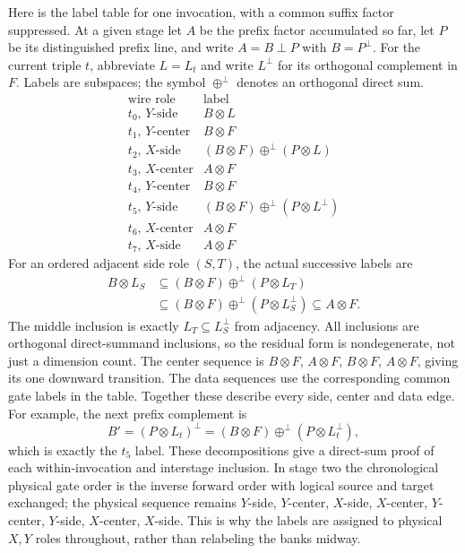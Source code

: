 Here is the label table for one invocation, with a common suffix factor suppressed. At a given stage let $A$ be the prefix factor accumulated so far, let $P$ be its distinguished prefix line, and write $A=B\perp P$ with $B=P^\perp$. For the current triple $t$, abbreviate $L=L_t$ and write $L^\perp$ for its orthogonal complement in $F$. Labels are subspaces; the symbol $\oplus^\perp$ denotes an orthogonal direct sum.
\[
\begin{array}{c|c}
\text{wire role}&\text{label}\\\hline
 t_0\text{, }Y\text{-side}&B\otimes L\\
 t_1\text{, }Y\text{-center}&B\otimes F\\
 t_2\text{, }X\text{-side}&(B\otimes F)\oplus^\perp(P\otimes L)\\
 t_3\text{, }X\text{-center}&A\otimes F\\
 t_4\text{, }Y\text{-center}&B\otimes F\\
 t_5\text{, }Y\text{-side}&(B\otimes F)\oplus^\perp(P\otimes L^\perp)\\
 t_6\text{, }X\text{-center}&A\otimes F\\
 t_7\text{, }X\text{-side}&A\otimes F
\end{array}
\]
For an ordered adjacent side role $(S,T)$, the actual successive labels
are
\begin{align*}
 B\otimes L_S
 &\subseteq (B\otimes F)\oplus^\perp(P\otimes L_T)\\
 &\subseteq (B\otimes F)\oplus^\perp(P\otimes L_S^\perp)
 \subseteq A\otimes F.
\end{align*}
The middle inclusion is exactly $L_T\subseteq L_S^\perp$ from
adjacency. All inclusions are orthogonal direct-summand inclusions,
so the residual form is nondegenerate, not just a dimension count.
The center sequence is $B\otimes F$, $A\otimes F$,
$B\otimes F$, $A\otimes F$, giving its one downward transition.
The data sequences use the corresponding common gate labels in the
table. Together these describe every side, center and data edge.
For example, the next prefix complement is
\[
 B'=(P\otimes L_t)^\perp=(B\otimes F)\oplus^\perp(P\otimes L_t^\perp),
\]
which is exactly the $t_5$ label. These decompositions give a direct-sum proof of each within-invocation and interstage inclusion. In stage two the chronological physical gate order is the inverse forward order with logical source and target exchanged; the physical sequence remains $Y$-side, $Y$-center, $X$-side, $X$-center, $Y$-center, $Y$-side, $X$-center, $X$-side. This is why the labels are assigned to physical $X,Y$ roles throughout, rather than relabeling the banks midway.

